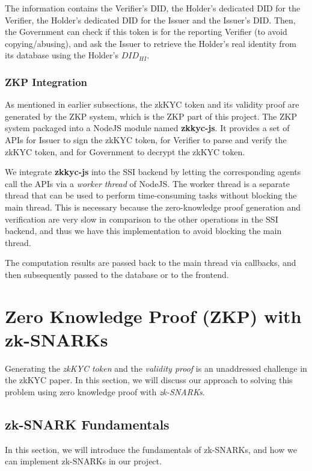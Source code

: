 \documentclass[
]{report}
\begin{document}
The information contains the Verifier's DID, the Holder's dedicated DID for
the Verifier, the Holder's dedicated DID for the Issuer and the Issuer's
DID. Then, the Government can check if this token is for the reporting
Verifier (to avoid copying/abusing), and ask the Issuer to retrieve the
Holder's real identity from its database using the Holder's $DID_{HI}$.

\subsection{ZKP Integration}
As mentioned in earlier subsections, the zkKYC token and its validity proof
are generated by the ZKP system, which is the ZKP part of this project.
The ZKP system packaged into a NodeJS module named \textbf{zkkyc-js}. It
provides a set of APIs for Issuer to sign the zkKYC token, for Verifier
to parse and verify the zkKYC token, and for Government to decrypt the
zkKYC token.

We integrate \textbf{zkkyc-js} into the SSI backend by letting the
corresponding agents call the APIs via a \emph{worker thread} of NodeJS.
The worker thread is a separate thread that can be used to perform
time-consuming tasks without blocking the main thread. This is necessary
because the zero-knowledge proof generation and verification are very
slow in comparison to the other operations in the SSI backend, and thus
we have this implementation to avoid blocking the main thread.

The computation results are passed back to the main thread via callbacks,
and then subsequently passed to the database or to the frontend.

\chapter{Zero Knowledge Proof (ZKP) with zk-SNARKs}

Generating the \emph{zkKYC token} and the \emph{validity proof} is an
unaddressed challenge in the zkKYC paper. In this section, we will
discuss our approach to solving this problem using zero knowledge proof
with \emph{zk-SNARKs}.

\section{zk-SNARK Fundamentals}

In this section, we will introduce the fundamentals of zk-SNARKs, and
how we can implement zk-SNARKs in our project.
\end{document}

